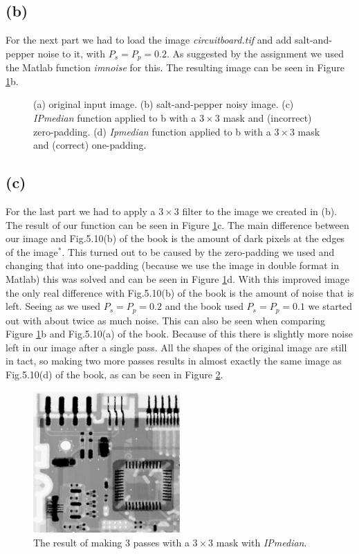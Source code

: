 \documentclass{article}
\begin{document}
\subsection*{(b)}
For the next part we had to load the image \textit{circuitboard.tif} and add salt-and-pepper noise to it, with $P_s = P_p = 0.2$. As suggested by the assignment we used the Matlab function \textit{imnoise} for this. The resulting image can be seen in Figure \ref{fig:IPmedian}b.

\begin{figure}[h]
    \centering
    
    \caption{(a) original input image. (b) salt-and-pepper noisy image. (c) \textit{IPmedian} function applied to b with a $3 \times 3$ mask and (incorrect) zero-padding. (d) \textit{Ipmedian} function applied to b with a $3 \times 3$ mask and (correct) one-padding.}
    \label{fig:IPmedian}
\end{figure}

\subsection*{(c)}
For the last part we had to apply a $3 \times 3$ filter to the image we created in (b). The result of our function can be seen in Figure \ref{fig:IPmedian}c. The main difference between our image and Fig.5.10(b) of the book is the amount of dark pixels at the edges of the image$^*$. This turned out to be caused by the zero-padding we used and changing that into one-padding (because we use the image in double format in Matlab) this was solved and can be seen in Figure \ref{fig:IPmedian}d. With this improved image the only real difference with Fig.5.10(b) of the book is the amount of noise that is left. Seeing as we used $P_s = P_p = 0.2$ and the book used $P_s = P_p = 0.1$ we started out with about twice as much noise. This can also be seen when comparing Figure \ref{fig:IPmedian}b and Fig.5.10(a) of the book. Because of this there is slightly more noise left in our image after a single pass. All the shapes of the original image are still in tact, so making two more passes results in almost exactly the same image as Fig.5.10(d) of the book, as can be seen in Figure \ref{fig:IPmedian3pass}.

\begin{figure}[h]
    \centering
    \includegraphics[width=0.5\textwidth]{Assignment_2/output_plots/multipassFilteredImage.png}
    \caption{The result of making 3 passes with a $3 \times 3$ mask with \textit{IPmedian}.}
    \label{fig:IPmedian3pass}
\end{figure}
\end{document}
